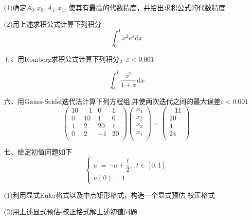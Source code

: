 \documentclass[a4paper,11pt,UTF8]{article}
\begin{document}
(1)确定$A_0,x_0,A_1,x_1$, 使其有最高的代数精度，并给出求积公式的代数精度

(2)用上述求积公式计算下列积分
$$
\int_{0}^1x^2e^x\mathrm{d}x
$$

\noindent 五、用Romberg求积公式计算下列积分，$\varepsilon<0.001$

$$
\int_0^1\frac{x^2}{1+x}\mathrm{d}x
$$

\noindent 六、用Gauss-Seidel迭代法计算下列方程组,并使两次迭代之间的最大误差$\varepsilon<0.001$
$$
\begin{pmatrix}
	10&-1&0&1\\
	0&10&1&0\\
	1&2&20&1\\
	0&2&-1&20\\
\end{pmatrix}\begin{pmatrix}
x_1\\
x_2\\
x_3\\
x_4\\
\end{pmatrix}=\begin{pmatrix}
	-11\\
	20\\
	4\\
	24\\
\end{pmatrix}
$$

\noindent 七、给定初值问题如下
$$
\begin{cases}
	u^\prime=-u+\dfrac{t}2,,t\in[0,1]\\
	u(0)=1
\end{cases}
$$

(1)利用显式Euler格式以及中点矩形格式，构造一个显式预估-校正格式

(2)用上述显式预估-校正格式解上述初值问题
\end{document}
